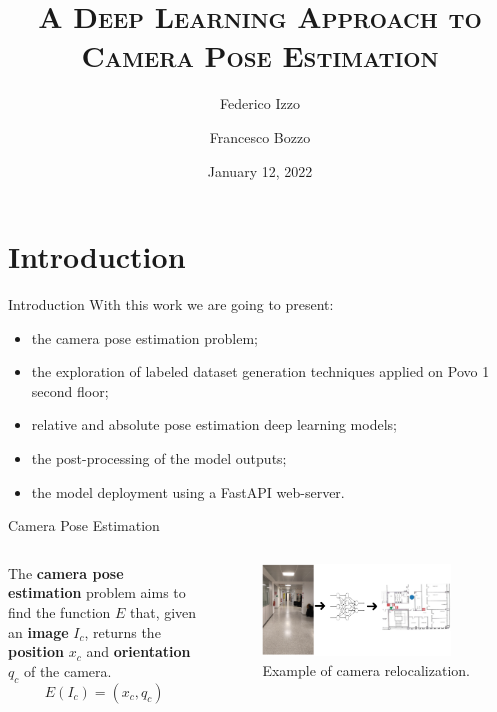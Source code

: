 \documentclass[
    center,
]{beamer}
\title[Deep Learning Camera Pose Estimation]{\textsc{A Deep Learning Approach to\\Camera Pose Estimation}}
\author[Bozzo - Izzo]{Federico Izzo \and Francesco Bozzo}
\institute[UniTN]{University of Trento}
\date{January 12, 2022}
\begin{document}
\begin{frame}
    \titlepage
\end{frame}



\section{Introduction}
\begin{frame}{Introduction}
    With this work we are going to present:
    \begin{itemize}
        \item the camera pose estimation problem;
        \item the exploration of labeled dataset generation techniques applied on Povo 1 second floor;
        \item relative and absolute pose estimation deep learning models;
        \item the post-processing of the model outputs;
        \item the model deployment using a FastAPI web-server.
    \end{itemize}
\end{frame}

\begin{frame}{Camera Pose Estimation}
    \begin{columns}
        The \textbf{camera pose estimation} problem aims to find the function $E$ that, given an \textbf{image} $I_c$, returns the \textbf{position} $x_c$ and \textbf{orientation} $q_c$ of the camera.
        \[
            E(I_c) = (x_c, q_c)
        \]

        \begin{figure}
            \centering
            \includegraphics[width=0.9\textwidth]{../imgs/introduction_example.png}
            \caption{Example of camera relocalization.}
        \end{figure}
    \end{columns}
\end{frame}
\end{document}
